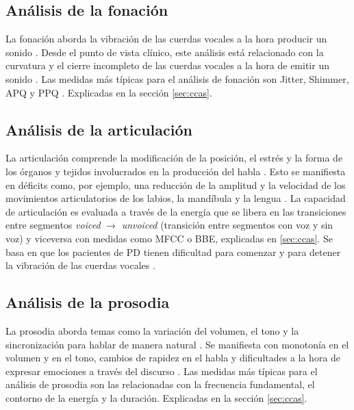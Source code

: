 \subsection{Análisis de la fonación}
La fonación aborda la vibración de las cuerdas vocales a la hora producir un sonido \cite{speechAnalysis}. Desde el punto de vista clínico, este análisis está relacionado con la curvatura y el cierre incompleto de las cuerdas vocales a la hora de emitir un sonido \cite{phonationfeat}. Las medidas más típicas para el análisis de fonación son Jitter, Shimmer, APQ y PPQ \cite{neurospeech}. Explicadas en la sección \ref{sec:ccas}.

\subsection{Análisis de la articulación}
La articulación comprende la modificación de la posición, el estrés y la forma de los órganos y tejidos involucrados en la producción del habla \cite{speechAnalysis}. Esto se manifiesta en déficits como, por ejemplo, una reducción de la amplitud y la velocidad de los movimientos articulatorios de los labios, la mandíbula y la lengua \cite{articulationfeat}. La capacidad de articulación es evaluada a través de la energía que se libera en las transiciones entre segmentos \textit{voiced} $\rightarrow$ \textit{unvoiced} (transición entre segmentos con voz y sin voz) y viceversa con medidas como MFCC o BBE, explicadas en \ref{sec:ccas}. Se basa en que los pacientes de PD tienen dificultad para comenzar y para detener la vibración de las cuerdas vocales \cite{neurospeech}.

\subsection{Análisis de la prosodia}
La prosodia aborda temas como la variación del volumen, el tono y la sincronización para hablar de manera natural \cite{speechAnalysis}. Se manifiesta con monotonía en el volumen y en el tono, cambios de rapidez en el habla y dificultades a la hora de expresar emociones a través del discurso \cite{emotionfeat}. Las medidas más típicas para el análisis de prosodia son las relacionadas con la frecuencia fundamental, el contorno de la energía y la duración. Explicadas en la sección \ref{sec:ccas}.

